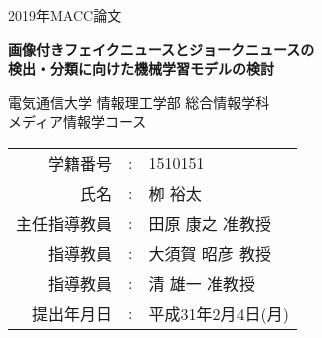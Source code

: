 \documentclass[a4paper,12pt,oneside,openany,uplatex]{jsreport}
\begin{document}
%
%
\begin{titlepage}
  \vspace*{7mm}
  \begin{center}
    \Large{2019年MACC論文}\\

    \vspace{40truemm}

    \LARGE{\textbf{画像付きフェイクニュースとジョークニュースの\\検出・分類に向けた機械学習モデルの検討}}\\

    \vspace{30truemm}

    \Large{電気通信大学 情報理工学部 総合情報学科}\\
    \Large{メディア情報学コース}\\

    \vspace{15truemm}

    \begin{table*}[h]
        \centering
        \hspace*{4em}
        \begin{tabular}{rcl}
            \large{学籍番号}&\large{:}&\large{1510151} \\
            \large{氏名}&\large{:}&\large{栁 裕太} \vspace{5truemm} \\
            \large{主任指導教員}&\large{:}&\large{田原 康之 准教授} \vspace{5truemm} \\
            \large{指導教員}&\large{:}&\large{大須賀 昭彦 教授} \vspace{5truemm} \\
            \large{指導教員}&\large{:}&\large{清 雄一 准教授} \vspace{5truemm} \\
            \large{提出年月日}&\large{:}&\large{平成31年2月4日(月)} \\
        \end{tabular}
    \end{table*}
  \end{center}
\end{titlepage}
%

\tableofcontents
%










\newpage
\printbibliography[title=参考文献]
%
%
%
\end{document}
